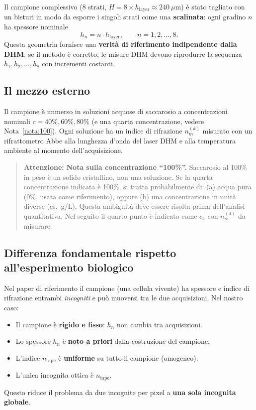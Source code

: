 Il campione complessivo (8 strati, $H = 8 \times h_\text{layer} \approx 240\ \mu\text{m}$)
è stato tagliato con un bisturi in modo da esporre i singoli strati come una
\textbf{scalinata}: ogni gradino $n$ ha spessore nominale
\[
  h_n = n \cdot h_\text{layer}, \qquad n = 1, 2, \dots, 8.
\]
Questa geometria fornisce una \textbf{verità di riferimento indipendente dalla DHM}:
se il metodo è corretto, le misure DHM devono riprodurre la sequenza
$h_1, h_2, \dots, h_8$ con incrementi costanti.

\subsection{Il mezzo esterno}

Il campione è immerso in soluzioni acquose di saccarosio a concentrazioni
nominali $c = 40\%, 60\%, 80\%$ (e una quarta concentrazione, vedere Nota~\ref{nota:100}).
Ogni soluzione ha un indice di rifrazione $n_m^{(k)}$ misurato con un
rifrattometro Abbe alla lunghezza d'onda del laser DHM e alla temperatura
ambiente al momento dell'acquisizione.

\begin{quote}
\label{nota:100}
\textcolor{red!70!black}{\textbf{Attenzione:}} \textbf{Nota sulla concentrazione ``100\%''.}
Saccarosio al 100\% in peso è un solido cristallino, non una soluzione.
Se la quarta concentrazione indicata è 100\%, si tratta probabilmente di:
(a) acqua pura (0\%, usata come riferimento), oppure
(b) una concentrazione in unità diverse (es.\ g/L).
Questa ambiguità deve essere risolta prima dell'analisi quantitativa.
Nel seguito il quarto punto è indicato come $c_4$ con $n_m^{(4)}$ da misurare.
\end{quote}

\subsection{Differenza fondamentale rispetto all'esperimento biologico}

Nel paper di riferimento il campione (una cellula vivente) ha spessore e indice
di rifrazione entrambi \textit{incogniti} e può muoversi tra le due acquisizioni.
Nel nostro caso:
\begin{itemize}
  \item Il campione è \textbf{rigido e fisso}: $h_n$ non cambia tra acquisizioni.
  \item Lo spessore $h_n$ è \textbf{noto a priori} dalla costruzione del campione.
  \item L'indice $n_\text{tape}$ è \textbf{uniforme} su tutto il campione (omogeneo). %
  \item L'unica incognita ottica è $n_\text{tape}$.
\end{itemize}
Questo riduce il problema da due incognite per pixel a \textbf{una sola incognita
globale}.

